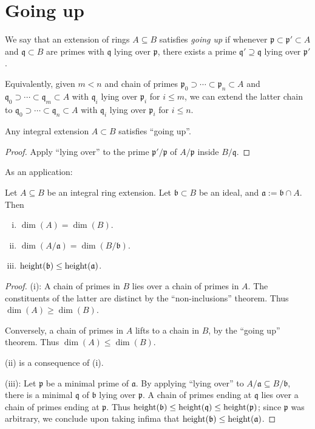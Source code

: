 \documentclass[10pt]{article}
\begin{document}
\section{Going up}
\label{sec:orgf2a76c1}

We say that an extension of rings \(A \subseteq B\) satisfies
\emph{going up} if whenever
\(\mathfrak{p} \subset \mathfrak{p} ' \subset A\) and
\(\mathfrak{q} \subset B\) are primes with \(\mathfrak{q}\) lying
over \(\mathfrak{p}\), there exists a prime
\(\mathfrak{q}' \supseteq \mathfrak{q}\) lying over
\(\mathfrak{p} '\).

Equivalently,
given \(m < n\) and chain of primes
\(\mathfrak{p}_0 \supset \dotsb \subset \mathfrak{p}_n \subset A\)
and
\(\mathfrak{q}_0 \supset \dotsb \subset \mathfrak{q}_m \subset A\)
with \(\mathfrak{q}_i\) lying over \(\mathfrak{p}_i\) for \(i \leq m\),
we can
extend the latter chain
to
\(\mathfrak{q}_0 \supset \dotsb \subset \mathfrak{q}_n \subset A\)
with \(\mathfrak{q}_i\) lying over \(\mathfrak{p}_i\) for \(i \leq
  n\).

\begin{theorem}
  Any integral extension $A \subset B$
  satisfies ``going up''.
\end{theorem}
\begin{proof}
  Apply ``lying over'' to the prime
  $\mathfrak{p} ' / \mathfrak{p}$ of $A/\mathfrak{p}$ inside
  $B/\mathfrak{q}$.
\end{proof}

As an application:
\begin{proposition}
  Let $A \subseteq B$ be an integral ring extension.
  Let $\mathfrak{b} \subset B$ be an ideal,
  and $\mathfrak{a} := \mathfrak{b} \cap A$.
  Then
  \begin{enumerate}[(i)]
  \item $\dim(A) = \dim(B)$.
  \item $\dim(A/\mathfrak{a}) = \dim(B/\mathfrak{b})$.
  \item $\operatorname{height}(\mathfrak{b}) \leq \operatorname{height}(\mathfrak{a})$.
  \end{enumerate}
\end{proposition}
\begin{proof}
  (i):
  A chain of primes in $B$ lies over a chain of primes in $A$.
  The constituents of the latter are distinct
  by the ``non-inclusions'' theorem.
  Thus $\dim(A) \geq \dim(B)$.

  Conversely, a chain of primes in $A$ lifts to a chain in $B$,
  by the ``going up'' theorem.
  Thus $\dim(A) \leq \dim(B)$.

  (ii) is a consequence of (i).

  (iii): Let $\mathfrak{p}$ be a minimal prime of
  $\mathfrak{a}$.  By applying ``lying over'' to
  $A/\mathfrak{a} \subseteq B/\mathfrak{b}$, there is a minimal
  $\mathfrak{q}$ of $\mathfrak{b}$ lying over $\mathfrak{p}$.  A
  chain of primes ending at $\mathfrak{q}$ lies over a chain of
  primes ending at $\mathfrak{p}$.  Thus
  $\operatorname{height}(\mathfrak{b}) \leq \operatorname{height}(\mathfrak{q}) \leq
  \operatorname{height}(\mathfrak{p})$; since $\mathfrak{p}$ was arbitrary, we
  conclude upon taking infima that
  $\operatorname{height}(\mathfrak{b}) \leq \operatorname{height}(\mathfrak{a})$.
\end{proof}
\end{document}
